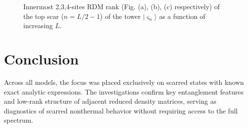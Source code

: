 \documentclass[11pt]{article}
\begin{document}
\begin{itemize}
\begin{itemize}
\begin{figure}[H]
\begin{subfigure}{0.45\textwidth}
        \caption{}
        \label{fig:image3hb}
    \end{subfigure}

    \caption{Innermost 2,3,4-sites RDM  rank (Fig. (a), (b), (c) respectively) of the top scar ($n=L/2 - 1$) of the tower $|\varsigma_n\rangle$ as a function of increasing $L$.}
    \label{fig:hb_scars_tower}
\end{figure}

    \end{itemize}
\end{itemize}


\vspace{0.5cm}
\pagebreak
\section*{Conclusion}

Across all models, the focus was placed exclusively on scarred states with known exact analytic expressions. The investigations confirm key entanglement features and low-rank structure of adjacent reduced density matrices, serving as diagnostics of scarred nonthermal behavior without requiring access to the full spectrum.
\end{document}
